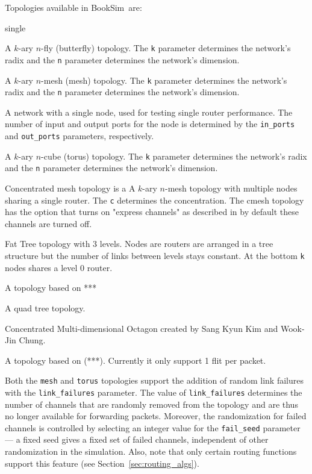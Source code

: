 \documentclass[11pt]{article}
\newcommand{\simname}{BookSim~}
\begin{document}
Topologies available in \simname are:
\begin{opt_list}{single}
\item[fly] A $k$-ary $n$-fly (butterfly) topology. The \texttt{k}
parameter determines the network's radix and the \texttt{n} parameter
determines the network's dimension.

\item[mesh] A $k$-ary $n$-mesh (mesh) topology. The \texttt{k}
parameter determines the network's radix and the \texttt{n} parameter determines
the network's dimension.

\item[single] A network with a single node, used for testing single
router performance.  The number of input and output ports for the node
is determined by the \texttt{in\_ports} and \texttt{out\_ports} parameters,
respectively.

\item[torus] A $k$-ary $n$-cube (torus) topology.  The \texttt{k}
parameter determines the network's radix and the \texttt{n} parameter determines
the network's dimension.
\item[cmesh] Concentrated mesh topology is a A $k$-ary $n$-mesh topology with multiple nodes sharing a single router. The \texttt{c} determines the concentration. The cmesh topology has the option that turns on "express channels" as described in  by default these channels are turned off. 

\item[fat tree] Fat Tree topology with 3 levels. Nodes are routers are arranged in a tree structure but the number of links between levels stays constant. At the bottom \texttt{k} nodes shares a level 0 router.

\item[flattened butterfly] A topology based on *** 

\item[quad tree] A quad tree topology.

\item[tree 4]

\item[cmo] Concentrated Multi-dimensional Octagon created by Sang Kyun Kim and Wook-Jin Chung.

\item[MECS] A topology based on (***). Currently it only support 1 flit per packet. 

\end{opt_list}

Both the \texttt{mesh} and \texttt{torus} topologies support the
addition of random link failures with the \texttt{link\_failures}
parameter.  The value of \texttt{link\_failures} determines the number
of channels that are randomly removed from the topology and are thus
no longer available for forwarding packets.  Moreover, the
randomization for failed channels is controlled by selecting an
integer value for the \texttt{fail\_seed} parameter --- a fixed seed
gives a fixed set of failed channels, independent of other
randomization in the simulation.  Also, note that only certain routing
functions support this feature (see Section~\ref{sec:routing_algs}).
\end{document}
